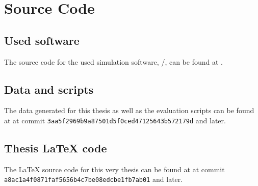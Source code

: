 \chapter{Source Code}
    \label{app:SourceCode}

    \section{Used software}
        The source code for the used simulation software, \ed/, can be found at \cite{Herbig2021EpiDynaST}.
    \section{Data and scripts}
        The data generated for this thesis as well as the evaluation scripts can be found at \cite{Krecké2021} at commit \texttt{3aa5f2969b9a87501d5f0ced47125643b572179d} and later.
    \section{Thesis \LaTeX{} code}
        The \LaTeX{} source code for this very thesis can be found at \cite{Krecké2021Thesis} at commit \texttt{a8ac1a4f087\-1faf5656b4c7be08edcbe1fb7ab01} and later.
%
%




